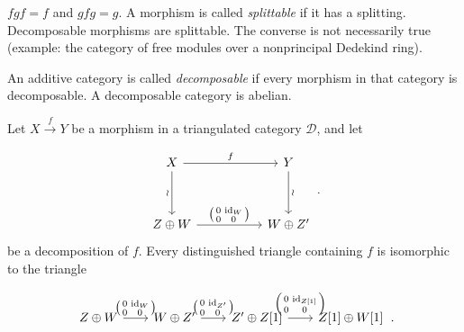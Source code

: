 \clearpage
{}%
\begingroup
\small
\setlength{\abovedisplayskip}{4pt plus 2pt minus 2pt}%
\setlength{\belowdisplayskip}{4pt plus 2pt minus 2pt}%

$fgf=f$ and $gfg=g$. A morphism is called \emph{splittable} if it has a
splitting. Decomposable morphisms are splittable. The converse is not
necessarily true (example: the category of free modules over a nonprincipal
Dedekind ring).

An additive category is called \emph{decomposable} if every morphism in that
category is decomposable. A decomposable category is abelian.

Let $X\xrightarrow{f}Y$ be a morphism in a triangulated category
$\mathcal D$, and let

\begin{equation*}
  \begin{tikzcd}[ampersand replacement=\&,column sep=5.2em,row sep=3.4em]
    X \arrow[r,"f"] \arrow[d,"\wr"']
      \& Y \arrow[d,"\wr"] \\
    Z\oplus W
      \arrow[r,"{\left(\begin{smallmatrix}0&\operatorname{id}_W\\0&0\end{smallmatrix}\right)}"]
      \& W\oplus Z'
  \end{tikzcd}\,.
\end{equation*}
be a decomposition of $f$. Every distinguished triangle containing $f$ is
isomorphic to the triangle

\begin{equation*}
  \begin{tikzcd}[ampersand replacement=\&,column sep=2.0em]
    Z\oplus W
      \arrow[r,"{\left(\begin{smallmatrix}0&\operatorname{id}_W\\0&0\end{smallmatrix}\right)}"]
      \& W\oplus Z'
      \arrow[r,"{\left(\begin{smallmatrix}0&\operatorname{id}_{Z'}\\0&0\end{smallmatrix}\right)}"]
      \& Z'\oplus Z[1]
      \arrow[r,"{\left(\begin{smallmatrix}0&\operatorname{id}_{Z[1]}\\0&0\end{smallmatrix}\right)}"]
      \& Z[1]\oplus W[1]
  \end{tikzcd}\,.
\end{equation*}

